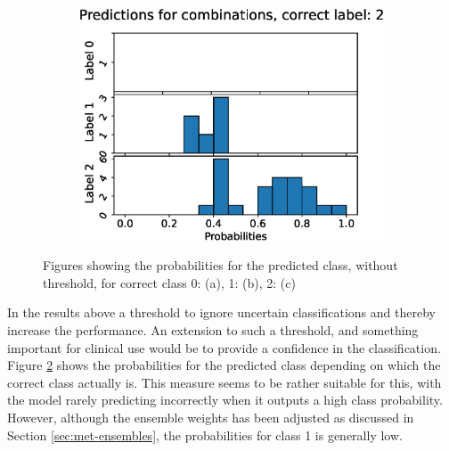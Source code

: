 \begin{figure}
\begin{subfigure}[t]{0.33\textwidth}
    \includegraphics[width=\textwidth]{files/figs/res/trunk/pc2.eps}
    \caption{}
    \label{fig:trunk-pc2}
  \end{subfigure}

  \caption{Figures showing the probabilities for the predicted class, without threshold, for correct class 0: (a), 1: (b), 2: (c)}
  \label{fig:trunk-pc}
\end{figure}

In the results above a threshold to ignore uncertain classifications and thereby increase the performance. An extension to such a threshold, and something important for clinical use would be to provide a confidence in the classification. Figure \ref{fig:trunk-pc} shows the probabilities for the predicted class depending on which the correct class actually is. This measure seems to be rather suitable for this, with the model rarely predicting incorrectly when it outputs a high class probability. However, although the ensemble weights has been adjusted as discussed in Section \ref{sec:met-ensembles}, the probabilities for class 1 is generally low.

\FloatBarrier
